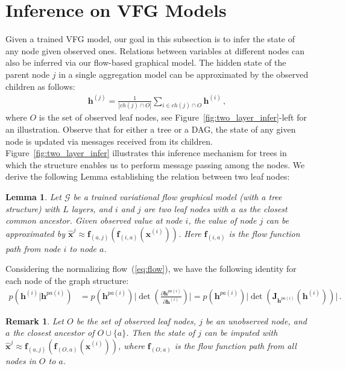 \documentclass{article}
\newtheorem{lemma}{Lemma}
\newtheorem{remark}{Remark}
\begin{document}
\section{Inference on VFG Models }\label{sec:infer}
Given a trained VFG model, our goal in this subsection is to infer the state of any node given observed ones. 
Relations between variables at different nodes can also be inferred via our flow-based graphical model. 
The hidden state of the parent node $j$ in a single aggregation model can be approximated by the observed children as follows:
 \begin{align}\label{eq:aggr_obs_ch}
\mathbf{h}^{(j)}  = \frac{1}{|ch(j) \cap O|}\sum_{i \in ch(j) \cap O} \mathbf{h}^{(i)} \, ,
\end{align}%
where $O$ is the set of observed leaf nodes, see Figure~\ref{fig:two_layer_infer}-left for an illustration. 
Observe that for either a tree or a DAG, the state of any given node is updated via messages received from its children. Figure~\ref{fig:two_layer_infer} illustrates this inference mechanism for trees in which the structure enables us to perform message passing among the nodes. 
We derive the following Lemma establishing the relation between two leaf nodes:
\begin{lemma}\label{lm:apprx}
Let $\mathcal{G}$ be a trained variational flow graphical model (with a tree structure) with $L$ layers, and $i$ and $j$ are two leaf nodes with $a$ as the closest common ancestor. Given observed value at node $i$, the value of node $j$ can be approximated by   $\widehat{\mathbf{x}}^{j} \approx  \mathbf{f}_{(a,j)}(\mathbf{f}_{(i, a)}(\mathbf{x}^{(i)}))$. Here $\mathbf{f}_{(i, a)}$ is the flow function path from node $i$ to node $a$. 
\end{lemma}
Considering the normalizing flow~(\ref{eq:flow}), we have the following identity for each node of the graph structure:
\begin{align*}
p(\mathbf{h}^{(i)} | \mathbf{h}^{pa(i)}) & = p(\mathbf{h}^{pa(i)}) \big|\det(\frac{\partial \mathbf{h}^{pa(i)} }{\partial \mathbf{h}^{(i)}})\big|   =
p(\mathbf{h}^{pa(i)}) \big|\det(\mathbf{J}_{\mathbf{h}^{pa(i)}}(\mathbf{h}^{(i)}))\big| \, .
\end{align*}
\begin{remark}\label{rmk:apprx_mul}
Let $O$ be the set of observed leaf nodes, $j$ be an unobserved node, and $a$ the closest ancestor of $O \cup \{a\}$. 
Then the state of $j$ can be imputed with $\widehat{\mathbf{x}}^{j} \approx  \mathbf{f}_{(a,j)}(\mathbf{f}_{(O, a)}(\mathbf{x}^{(i)}))$, where $\mathbf{f}_{(O, a)}$ is the flow function path from all nodes in $O$ to $a$.
\end{remark}
\end{document}
